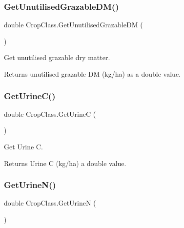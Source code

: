 \subsubsection{\texorpdfstring{GetUnutilisedGrazableDM()}{GetUnutilisedGrazableDM()}}
{\footnotesize\ttfamily double Crop\+Class.\+Get\+Unutilised\+Grazable\+DM (\begin{DoxyParamCaption}{ }\end{DoxyParamCaption})\hspace{0.3cm}{\ttfamily [inline]}}



Get unutilised grazable dry matter. 

\begin{DoxyReturn}{Returns}
unutilised grazable DM (kg/ha) as a double value. 
\end{DoxyReturn}
\mbox{\label{class_crop_class_a9a4e61a257813bdea4ce3bad42dd6ef7}} 
\subsubsection{\texorpdfstring{GetUrineC()}{GetUrineC()}}
{\footnotesize\ttfamily double Crop\+Class.\+Get\+UrineC (\begin{DoxyParamCaption}{ }\end{DoxyParamCaption})\hspace{0.3cm}{\ttfamily [inline]}}



Get Urine C. 

\begin{DoxyReturn}{Returns}
Urine C (kg/ha) a double value. 
\end{DoxyReturn}
\mbox{\label{class_crop_class_a4f136a37849e61183db1d5df4e3bb606}} 
\subsubsection{\texorpdfstring{GetUrineN()}{GetUrineN()}}
{\footnotesize\ttfamily double Crop\+Class.\+Get\+UrineN (\begin{DoxyParamCaption}{ }\end{DoxyParamCaption})\hspace{0.3cm}{\ttfamily [inline]}}



